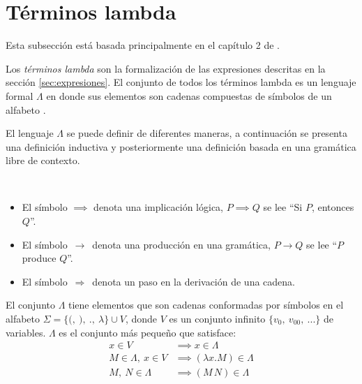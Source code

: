 \section{Términos lambda}
\label{sec:terminos-lambda}

Esta subsección está basada principalmente en el capítulo 2 de \cite{Barendregt:Bible}.

Los \emph{términos lambda} son la formalización de las expresiones descritas en la sección \ref{sec:expresiones}. El conjunto de todos los términos lambda es un lenguaje formal \( Λ \) en donde sus elementos son cadenas compuestas de símbolos de un alfabeto \cite{Hopcroft:Automata}.

El lenguaje \( Λ \) se puede definir de diferentes maneras, a continuación se presenta una definición inductiva y posteriormente una definición basada en una gramática libre de contexto.

\begin{rem}[Notación]\
  \begin{itemize}
  \item El símbolo \( \implies \) denota una implicación lógica, \( P \implies Q \) se lee ``Si \( P \), entonces \( Q \)''.
  \item El símbolo \( \, \longrightarrow\, \) denota una producción en una gramática, \( P \longrightarrow Q \) se lee ``\( P \) produce \( Q \)''.
  \item El símbolo \( \, \Rightarrow\, \) denota un paso en la derivación de una cadena.
  \end{itemize}
\end{rem}

\begin{defn}
  El conjunto \( Λ \) tiene elementos que son cadenas conformadas por símbolos en el alfabeto \( Σ=\{\mathtt{(},\ \mathtt{)},\ \mathtt{.},\ λ\} \cup V \), donde \( V \) es un conjunto infinito \( \{v_{0},\ v_{00},\ ... \} \) de variables. \( Λ \) es el conjunto más pequeño que satisface:
  \label{defn:terminos}
  \begin{subequations}
    \begin{align}
      \label{terminos:atomos} \tag{a}
      x \in V & \implies x \in Λ \\
      \label{terminos:abstracciones} \tag{b}
      M \in Λ,\ x \in V & \implies (λx.M) \in Λ \\
      \label{terminos:aplicaciones} \tag{c}
      M,\ N \in Λ & \implies (M\, N) \in Λ
    \end{align}
  \end{subequations}
\end{defn}

